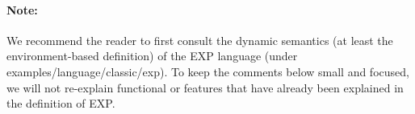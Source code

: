 \begin{kblock}[text]
\paragraph{Note:}{
We recommend the reader to first consult the dynamic semantics (at
least the environment-based definition) of the EXP language (under
examples/language/classic/exp).  To keep the comments below small and
focused, we will not re-explain functional or \K features that have
already been explained in the definition of EXP.
}

\end{kblock}

\vspace*{3ex}
